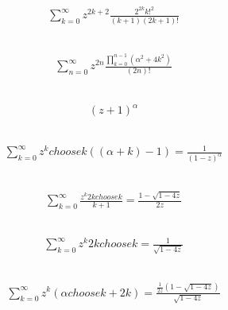 \documentclass[12pt]{article}
\begin{document}
\subsection{}
\begin{align*}
\sum_{k=0}^{\infty} z^{2 k + 2} \frac{2^{2 k} k!^{2}}{\left(k + 1\right) \left(2 k + 1\right)!}
\end{align*}
\vspace{1cm}
\subsection{}
\begin{align*}
\sum_{n=0}^{\infty} z^{2 n} \frac{\prod_{k=0}^{n - 1} \left(\alpha^{2} + 4 k^{2}\right)}{\left(2 n\right)!}
\end{align*}
\vspace{1cm}
\subsection{}
\begin{align*}
\left(z + 1\right)^{\alpha}
\end{align*}
\vspace{1cm}
\subsection{}
\begin{align*}
\sum_{k=0}^{\infty} z^{k} choose k \left(\left(\alpha + k\right) - 1\right) = \frac{1}{\left(1 - z\right)^{\alpha}}
\end{align*}
\vspace{1cm}
\subsection{}
\begin{align*}
\sum_{k=0}^{\infty} \frac{z^{k} 2 k choose k}{k + 1} = \frac{1 - \sqrt{1 - 4 z}}{2 z}
\end{align*}
\vspace{1cm}
\subsection{}
\begin{align*}
\sum_{k=0}^{\infty} z^{k} 2 k choose k = \frac{1}{\sqrt{1 - 4 z}}
\end{align*}
\vspace{1cm}
\subsection{}
\begin{align*}
\sum_{k=0}^{\infty} z^{k} \left(\alpha choose k + 2 k\right) = \frac{\frac{1}{2 z} \left(1 - \sqrt{1 - 4 z}\right)}{\sqrt{1 - 4 z}}
\end{align*}
\vspace{1cm}
\end{document}

